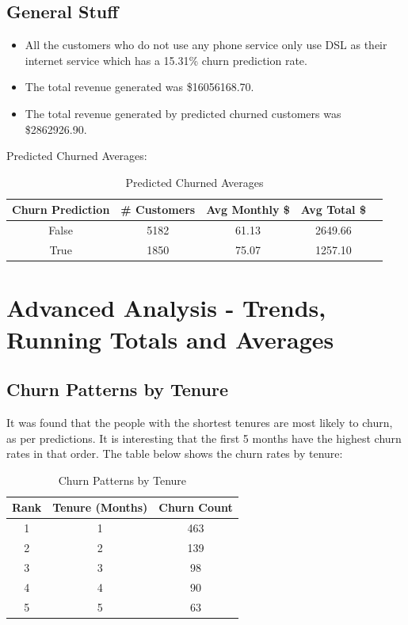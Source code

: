 \documentclass{article}
\theoremstyle{mytheoremstyle}
\theoremstyle{mytheoremstyle}
\theoremstyle{myproblemstyle}
\begin{document}
\subsection{General Stuff}
\begin{itemize}
    \item All the customers who do not use any phone service only use DSL as their internet service which has a 15.31\% churn prediction rate.
    \item The total revenue generated was \$16056168.70.
    \item The total revenue generated by predicted churned customers was \$2862926.90.
\end{itemize}

Predicted Churned Averages:

\begin{table}[H]
    \centering
    \begin{tabular}{|c|c|c|c|c|}
        \hline
        \textbf{Churn Prediction} & \textbf{\# Customers} & \textbf{Avg Monthly \$} & \textbf{Avg Total \$} \\
        \hline
        False & 5182 & 61.13 & 2649.66 \\
        True & 1850 & 75.07 & 1257.10 \\
        \hline
    \end{tabular}
    \caption{Predicted Churned Averages}
\end{table}


\section{Advanced Analysis - Trends, Running Totals and Averages}
\subsection{Churn Patterns by Tenure}
It was found that the people with the shortest tenures are most likely to churn, as per predictions. It is interesting that the first 5 months have the highest churn rates in that order. The table below shows the churn rates by tenure:

\begin{table}[H]
    \centering
    \begin{tabular}{|c|c|c|}
        \hline
        \textbf{Rank} & \textbf{Tenure (Months)} & \textbf{Churn Count} \\ 
        \hline
        1 & 1 & 463 \\
        2 & 2 & 139 \\
        3 & 3 & 98 \\
        4 & 4 & 90 \\
        5 & 5 & 63 \\
        \hline
    \end{tabular}    
    \caption{Churn Patterns by Tenure}
\end{table}
\end{document}
